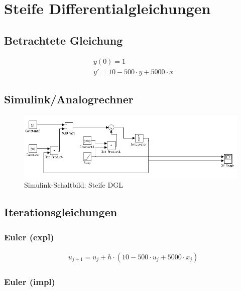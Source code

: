 \documentclass[10pt]{scrartcl}
\author{André Harms, Oliver Steenbuck}
\title{\titletext}
\date{02.11.2011}
\begin{document}
\maketitle

\setcounter{tocdepth}{3}
\tableofcontents
\listoffigures
\lstlistoflistings


\section{Steife Differentialgleichungen}
	\subsection{Betrachtete Gleichung}
		\begin{align}
		&y(0) = 1\\
		&y' = 10 - 500 \cdot y + 5000 \cdot x
		\end{align}
		
	\subsection{Simulink/Analogrechner}
	
	\begin{figure}[htbp]
	\centering
		\includegraphics[scale=0.5]{simulink_aufg1_a}
	\caption{Simulink-Schaltbild: Steife DGL}
	\label{fig:simulinkAufg1}
	\end{figure}

	\subsection{Iterationsgleichungen}
		\subsubsection{Euler (expl)}
		\begin{align}
		&u_{j+1} = u_j + h \cdot ( 10 - 500 \cdot u_j + 5000 \cdot x_j )
		\end{align}				
		
		\subsubsection{Euler (impl)}
		
\end{document}
